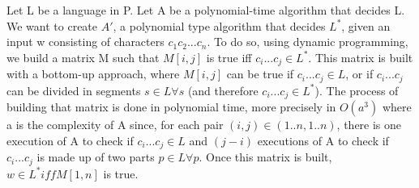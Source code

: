 
Let L be a language in P.
Let A be a polynomial-time algorithm that decides L.
We want to create $A'$, a polynomial type algorithm that decides $L^*$, given an input w consisting of characters $c_1c_2...c_n$.
To do so, using dynamic programming, we build a matrix M such that $M[i,j]$ is true iff $c_i...c_j \in L^*$. 
This matrix is built with a bottom-up approach, where $M[i,j]$ can be true if $c_i...c_j \in L$, or if $c_i...c_j$ can be divided in segments $s \in L \forall s$ (and therefore $c_i...c_j \in L^*$).
The process of building that matrix is done in polynomial time, more precisely in $O(a^3)$ where a is the complexity of A since, for each pair $(i,j) \in (1..n, 1..n)$, there is one execution of A to check if $c_i...c_j\in L$ and $(j - i)$ executions of A to check if $c_i...c_j$ is made up of two parts $p \in L \forall p$.
Once this matrix is built, $w \in L^* iff M[1,n]$ is true.